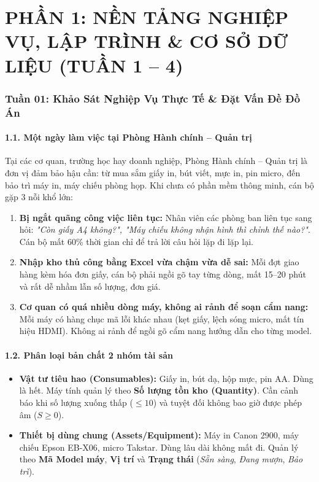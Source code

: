 \documentclass[11pt,a4paper]{article}
\begin{document}
\part*{\Large \color{blue!85!black} PHẦN 1: NỀN TẢNG NGHIỆP VỤ, LẬP TRÌNH \& CƠ SỞ DỮ LIỆU (TUẦN 1 -- 4)}

\section{Tuần 01: Khảo Sát Nghiệp Vụ Thực Tế \& Đặt Vấn Đề Đồ Án}

\subsection{1.1. Một ngày làm việc tại Phòng Hành chính -- Quản trị}
Tại các cơ quan, trường học hay doanh nghiệp, Phòng Hành chính -- Quản trị là đơn vị đảm bảo hậu cần: từ mua sắm giấy in, bút viết, mực in, pin micro, đến bảo trì máy in, máy chiếu phòng họp.
Khi chưa có phần mềm thông minh, cán bộ gặp 3 nỗi khổ lớn:
\begin{enumerate}
    \item \textbf{Bị ngắt quãng công việc liên tục:} Nhân viên các phòng ban liên tục sang hỏi: \textit{"Còn giấy A4 không?", "Máy chiếu không nhận hình thì chỉnh thế nào?"}. Cán bộ mất 60\% thời gian chỉ để trả lời câu hỏi lặp đi lặp lại.
    \item \textbf{Nhập kho thủ công bằng Excel vừa chậm vừa dễ sai:} Mỗi đợt giao hàng kèm hóa đơn giấy, cán bộ phải ngồi gõ tay từng dòng, mất 15--20 phút và rất dễ nhầm lẫn số lượng, đơn giá.
    \item \textbf{Cơ quan có quá nhiều dòng máy, không ai rảnh để soạn cẩm nang:} Mỗi máy có hàng chục mã lỗi khác nhau (kẹt giấy, lệch sóng micro, mất tín hiệu HDMI). Không ai rảnh để ngồi gõ cẩm nang hướng dẫn cho từng model.
\end{enumerate}

\subsection{1.2. Phân loại bản chất 2 nhóm tài sản}
\begin{itemize}
    \item \textbf{Vật tư tiêu hao (Consumables):} Giấy in, bút dạ, hộp mực, pin AA. Dùng là hết. Máy tính quản lý theo \textbf{Số lượng tồn kho (Quantity)}. Cần cảnh báo khi số lượng xuống thấp ($\le 10$) và tuyệt đối không bao giờ được phép âm ($S \ge 0$).
    \item \textbf{Thiết bị dùng chung (Assets/Equipment):} Máy in Canon 2900, máy chiếu Epson EB-X06, micro Takstar. Dùng lâu dài không mất đi. Quản lý theo \textbf{Mã Model máy}, \textbf{Vị trí} và \textbf{Trạng thái} (\textit{Sẵn sàng}, \textit{Đang mượn}, \textit{Bảo trì}).
\end{itemize}
\end{document}
